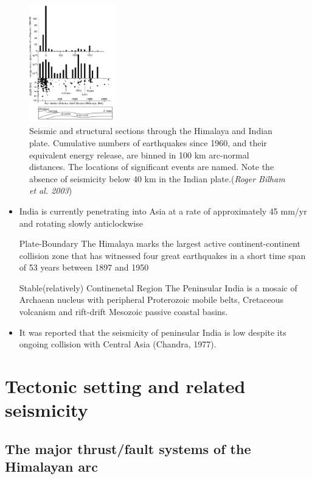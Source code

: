 \documentclass[smaller]{beamer}
\begin{document}
\begin{frame}
\begin{figure}
\includegraphics[height=5.1cm]{eqpd.png}
\caption{Seismic and structural sections through the Himalaya and Indian plate. Cumulative numbers of earthquakes since
1960, and their equivalent energy release, are binned in 100 km arc-normal distances. The locations of significant events are
named. Note the absence of seismicity below 40 km in the Indian plate.(\textit{Roger Bilham et al. 2003})}
\end{figure}
\end{frame}
\begin{frame}
	\begin{itemize}
	\item India is currently penetrating into Asia at a rate of approximately 45 mm/yr and rotating slowly anticlockwise
	 \begin{block}{Plate-Boundary}
The Himalaya marks the largest active continent-continent collision zone that has witnessed four great earthquakes in a short time span of 53 years between 1897
and 1950
\end{block}
	\begin{block}{Stable(relatively) Continenetal Region}
	The Peninsular India is a mosaic of Archaean nucleus with peripheral Proterozoic mobile belts, Cretaceous volcanism and rift-drift Mesozoic passive coastal basins.
\end{block}
	\item It was reported that the seismicity of peninsular India is low despite its ongoing collision with Central Asia (Chandra, 1977).
	\end{itemize}
\end{frame}
\section{Tectonic setting and related seismicity}

\subsection{The major thrust/fault systems of the Himalayan arc}
\end{document}
